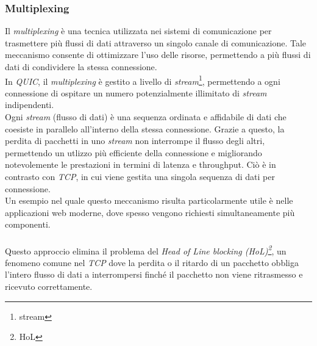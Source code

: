 \subsubsection{Multiplexing}
Il \emph{multiplexing} è una tecnica utilizzata nei sistemi di comunicazione per trasmettere più flussi di dati attraverso un singolo canale di comunicazione. 
Tale meccanismo consente di ottimizzare l'uso delle risorse, permettendo a più flussi di dati di condividere la stessa connessione.
\\
In \emph{QUIC}, il \emph{multiplexing} è gestito a livello di \emph{stream}\footnote{\gls{stream}}, permettendo a ogni connessione di ospitare un numero potenzialmente illimitato di \emph{stream} indipendenti.
\\
Ogni \emph{stream} (flusso di dati) è una sequenza ordinata e affidabile di dati che coesiste in parallelo all'interno della stessa connessione. Grazie a questo, la perdita di pacchetti in uno \emph{stream} non interrompe il flusso degli altri, permettendo un utlizzo più efficiente della connessione e migliorando notevolemente le prestazioni in termini di latenza e throughput. Ciò è in contrasto con \emph{TCP}, in cui viene gestita una singola sequenza di dati per connessione.
\\
Un esempio nel quale questo meccanismo risulta particolarmente utile è nelle applicazioni web moderne,
dove spesso vengono richiesti simultaneamente più componenti. 
\\\\
Questo approccio elimina il problema del \emph{Head of Line blocking (HoL)\footnote{\gls{HoL}}}, un fenomeno comune nel \emph{TCP} dove la perdita o il ritardo di un pacchetto obbliga l'intero flusso di dati a interrompersi  finché il pacchetto non viene ritrasmesso e ricevuto correttamente.

